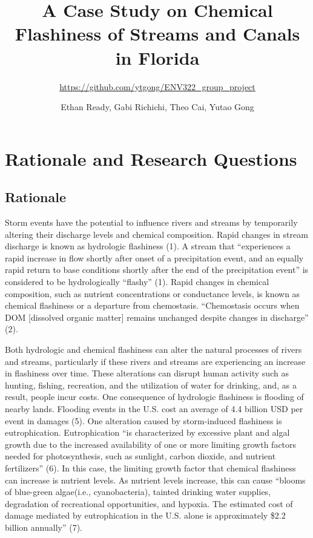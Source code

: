 \documentclass[12pt,]{article}
\title{A Case Study on Chemical Flashiness of Streams and Canals in Florida}
\subtitle{\url{https://github.com/ytgong/ENV322_group_project}}
\author{Ethan Ready, Gabi Richichi, Theo Cai, Yutao Gong}
\date{}
\begin{document}
\maketitle

\newpage

\hypertarget{rationale-and-research-questions}{%
\section{Rationale and Research
Questions}\label{rationale-and-research-questions}}

\hypertarget{rationale}{%
\subsection{Rationale}\label{rationale}}

Storm events have the potential to influence rivers and streams by
temporarily altering their discharge levels and chemical composition.
Rapid changes in stream discharge is known as hydrologic flashiness (1).
A stream that ``experiences a rapid increase in flow shortly after onset
of a precipitation event, and an equally rapid return to base conditions
shortly after the end of the precipitation event'' is considered to be
hydrologically ``flashy'' (1). Rapid changes in chemical composition,
such as nutrient concentrations or conductance levels, is known as
chemical flashiness or a departure from chemostasis. ``Chemostasis
occurs when DOM {[}dissolved organic matter{]} remains unchanged despite
changes in discharge'' (2).

Both hydrologic and chemical flashiness can alter the natural processes
of rivers and streams, particularly if these rivers and streams are
experiencing an increase in flashiness over time. These alterations can
disrupt human activity such as hunting, fishing, recreation, and the
utilization of water for drinking, and, as a result, people incur costs.
One consequence of hydrologic flashiness is flooding of nearby lands.
Flooding events in the U.S. cost an average of 4.4 billion USD per event
in damages (5). One alteration caused by storm-induced flashiness is
eutrophication. Eutrophication ``is characterized by excessive plant and
algal growth due to the increased availability of one or more limiting
growth factors needed for photosynthesis, such as sunlight, carbon
dioxide, and nutrient fertilizers'' (6). In this case, the limiting
growth factor that chemical flashiness can increase is nutrient levels.
As nutrient levels increase, this can cause ``blooms of blue-green
algae(i.e., cyanobacteria), tainted drinking water supplies, degradation
of recreational opportunities, and hypoxia. The estimated cost of damage
mediated by eutrophication in the U.S. alone is approximately \$2.2
billion annually'' (7).
\end{document}
